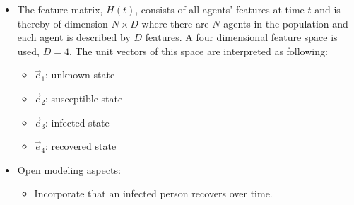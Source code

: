 \documentclass[]{article}
\begin{document}
\begin{itemize}
\begin{itemize}
	\end{itemize}
	\item The feature matrix, $H(t)$, consists of all agents' features at time $t$ and is thereby of dimension $N\times D$ where there are $N$ agents in the population and each agent is described by $D$ features. A four dimensional feature space is used, $D=4$. The unit vectors of this space are interpreted as following:
	\begin{itemize}
		\item $\vec{e}_1$: unknown state
		\item $\vec{e}_2$: susceptible state
		\item $\vec{e}_3$: infected state
		\item $\vec{e}_4$: recovered state
	\end{itemize}
	\item Open modeling aspects:
	\begin{itemize}
		\item Incorporate that an infected person recovers over time.
	\end{itemize}
\end{itemize}
\end{document}
